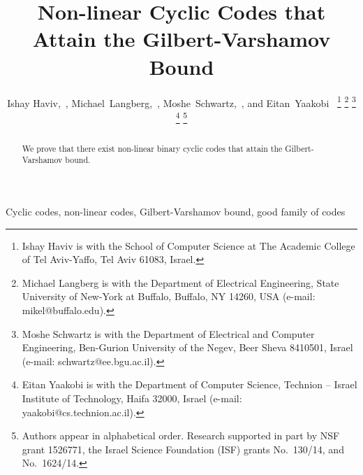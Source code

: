 \documentclass[twocolumn,twoside]{IEEEtran}
\theoremstyle{plain}
\begin{document}

\IEEEoverridecommandlockouts \title{\textbf{Non-linear Cyclic Codes
    that Attain the Gilbert-Varshamov Bound}}

\author{\large
Ishay Haviv,~,
Michael~Langberg,~,
Moshe~Schwartz,~,
and Eitan~Yaakobi~%
\thanks{Ishay Haviv is with the School of Computer Science
at The Academic College of Tel Aviv-Yaffo, Tel Aviv 61083, Israel.}
\thanks{Michael Langberg is with the Department
  of Electrical Engineering, State University of New-York at Buffalo, Buffalo, NY 14260, USA (e-mail: mikel@buffalo.edu).}%
\thanks{Moshe Schwartz is with the Department
   of Electrical and Computer Engineering, Ben-Gurion University of the Negev,
   Beer Sheva 8410501, Israel
   (e-mail: schwartz@ee.bgu.ac.il).}%
\thanks{Eitan Yaakobi is with the Department
  of Computer Science, Technion -- Israel Institute of Technology, Haifa 32000, Israel (e-mail: yaakobi@cs.technion.ac.il).}%
\thanks{Authors appear in alphabetical order. Research supported in part by NSF grant 1526771, the Israel Science Foundation (ISF) grants No.~130/14, and No.~1624/14.}
}

\maketitle

\begin{abstract}
We prove that there exist non-linear binary cyclic
codes that attain the
Gilbert-Varshamov bound.
\end{abstract}

\begin{IEEEkeywords}
  Cyclic codes, non-linear codes, Gilbert-Varshamov bound, good family
  of codes
\end{IEEEkeywords}


\end{document}
